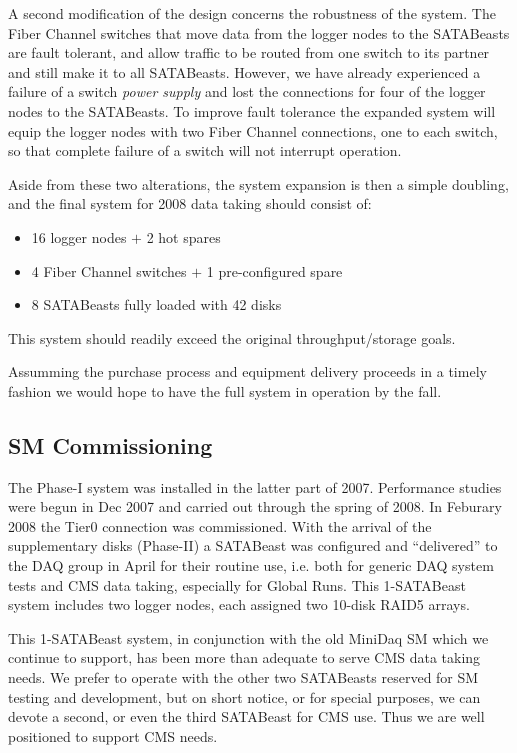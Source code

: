 A second modification of the design concerns the robustness of the system.
The Fiber Channel switches that move data from the logger nodes to the 
SATABeasts are fault tolerant, and allow traffic to be routed from one
switch to its partner and still make it to all SATABeasts. 
However, we have already experienced a failure of a switch {\it power supply}
and lost the connections for four of the logger nodes to the  SATABeasts.
To improve fault tolerance the expanded system will equip the logger nodes
with two Fiber Channel connections, one to each switch, so that complete failure of a switch
will not interrupt operation.

Aside from these two alterations, the system expansion is then a simple doubling,
and the final system for 2008 data taking should consist of:
\begin{itemize}
\item 16 logger nodes $+$ 2 hot spares
\item 4 Fiber Channel switches $+$ 1 pre-configured spare
\item 8 SATABeasts fully loaded with 42 disks
\end{itemize}
This system should readily exceed the original throughput/storage goals.

Assumming the purchase process and equipment delivery proceeds in a timely
fashion we would hope to have the full system in operation by the fall.


\subsection{SM Commissioning\label{sec:SMcommiss}}
The Phase-I system was installed in the latter part of 2007.
Performance studies were begun in Dec 2007 and carried out through the spring of 2008.
In Feburary 2008 the Tier0 connection was commissioned.
With the arrival of the supplementary disks (Phase-II) a SATABeast was configured
and ``delivered'' to the DAQ group in April for their routine use,
i.e. both for generic DAQ system tests and CMS data taking, especially for Global Runs.
This 1-SATABeast system includes two logger nodes, each assigned two 10-disk RAID5
arrays.

This 1-SATABeast system, in conjunction with the old MiniDaq SM which we continue
to support, has been more than adequate to serve CMS data taking needs.
We prefer to operate with the other two SATABeasts reserved for SM testing
and development, but on short notice, or for special purposes, we can devote
a second, or even the third SATABeast for CMS use.
Thus we are well positioned to support CMS needs.

